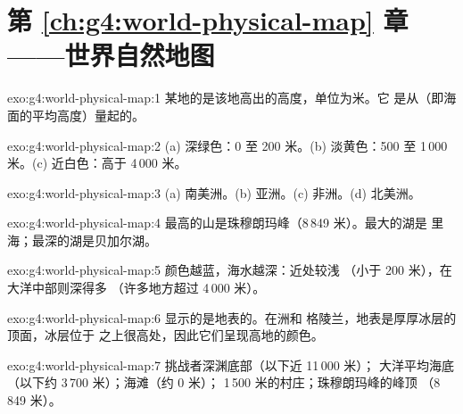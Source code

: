\section*{第 \ref{ch:g4:world-physical-map} 章——世界自然地图}

\begin{solution}{exo:g4:world-physical-map:1}
某地的是该地高出的高度，单位为米。它
是从（即海面的平均高度）量起的。
\end{solution}

\begin{solution}{exo:g4:world-physical-map:2}
(a) 深绿色：0 至 200 米。(b) 淡黄色：500 至
1\,000 米。(c) 近白色：高于 4\,000 米。
\end{solution}

\begin{solution}{exo:g4:world-physical-map:3}
(a) 南美洲。(b) 亚洲。(c) 非洲。(d) 北美洲。
\end{solution}

\begin{solution}{exo:g4:world-physical-map:4}
最高的山是珠穆朗玛峰（8\,849 米）。最大的湖是
里海；最深的湖是贝加尔湖。
\end{solution}

\begin{solution}{exo:g4:world-physical-map:5}
颜色越蓝，海水越深：近处较浅
（小于 200 米），在大洋中部则深得多
（许多地方超过 4\,000 米）。
\end{solution}

\begin{solution}{exo:g4:world-physical-map:6}
显示的是地表的。在洲和
格陵兰，地表是厚厚冰层的顶面，冰层位于
之上很高处，因此它们呈现高地的颜色。
\end{solution}

\begin{solution}{exo:g4:world-physical-map:7}
挑战者深渊底部（以下近 11\,000 米）；
大洋平均海底（以下约 3\,700 米）；海滩（约
0 米）； 1\,500 米的村庄；珠穆朗玛峰的峰顶
（8\,849 米）。
\end{solution}

